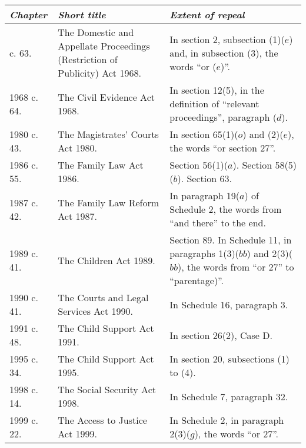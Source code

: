 \documentclass[12pt,a4paper]{article}
\begin{document}
{\footnotesize
\begin{longtable}{p{43.5645pt}p{132.50633pt}p{177.92844pt}}
\hline
\itshape Chapter	&\itshape Short title	&\itshape Extent of repeal\\
\hline
\endhead
\hline
\endlastfoot
1968 c. 63. 	&The Domestic and Appellate Proceedings (Restriction of Publicity) Act 1968. 	&In section 2, subsection (1)($e$)  and, in subsection (3), the words “or ($e$)”.\\
1968 c. 64. 	&The Civil Evidence Act 1968. 	&In section 12(5), in the definition of “relevant proceedings”, paragraph ($d$).\\
1980 c. 43. 	&The Magistrates' Courts Act 1980. 	&In section 65(1)($o$)  and (2)($e$), the words “or section 27”.\\
1986 c. 55. 	&The Family Law Act 1986. 	&Section 56(1)($a$).\newline
		Section 58(5)($b$).\newline
		Section 63. \\
1987 c. 42. 	&The Family Law Reform Act 1987. 	&In paragraph 19($a$)  of Schedule 2, the words from “and there” to the end.\\
1989 c. 41. 	&The Children Act 1989. 	&Section 89. \newline
		In Schedule 11, in paragraphs 1(3)($bb$)  and 2(3)($bb$), the words from “or 27” to “parentage)”.\\
1990 c. 41. 	&The Courts and Legal Services Act 1990. 	&In Schedule 16, paragraph 3. \\
1991 c. 48. 	&The Child Support Act 1991. 	&In section 26(2), Case D.\\
1995 c. 34. 	&The Child Support Act 1995. 	&In section 20, subsections (1)  to (4).\\
1998 c. 14. 	&The Social Security Act 1998. 	&In Schedule 7, paragraph 32. \\
1999 c. 22. 	&The Access to Justice Act 1999. 	&In Schedule 2, in paragraph 2(3)($g$), the words “or 27”.\\
\end{longtable}

}
\end{document}

